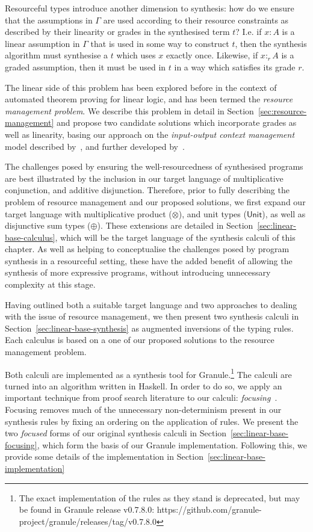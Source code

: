 Resourceful types introduce another dimension to synthesis: how do we ensure
that the assumptions in $\Gamma$ are used according to their resource
constraints as described by their linearity or grades in the synthesised term $t$? I.e. if $x : A$
is a linear assumption in $\Gamma$ that is used in some way to construct $t$,
then the synthesis algorithm must synthesise a $t$ which uses $x$ exactly once.
Likewise, if $x :_r A$ is a graded assumption, then it must be used in $t$ in a
way which satisfies its grade $r$.
 
The linear side of this problem has been explored before in the context of
automated theorem proving for linear logic, and has been termed the
\textit{resource management problem}. We describe this problem in detail in
Section~\ref{sec:resource-management} and propose two candidate solutions which
incorporate grades as well as linearity, basing our approach on the
\textit{input-output context management} model described
by~\citet{HODAS1994327}, and further developed by~\citet{CERVESATO2000133}. 

The challenges posed by ensuring the well-resourcedness of synthesised programs
are best illustrated by the inclusion in our target language of multiplicative
conjunction, and additive disjunction. Therefore, prior to fully describing the
problem of resource management and our proposed solutions, we first expand our
target language with multiplicative product ($\otimes$), and unit types
($\mathsf{Unit}$), as well as disjunctive sum types ($\oplus$). These extensions
are detailed in Section~\ref{sec:linear-base-calculus}, which will be the target
language of the synthesis calculi of this chapter. As well as helping to
conceptualise the challenges posed by program synthesis in a resourceful
setting, these have the added benefit of allowing the synthesis of more
expressive programs, without introducing unnecessary complexity at this stage.

Having outlined both a suitable target language and two approaches to dealing
with the issue of resource management, we then present two synthesis calculi in
Section~\ref{sec:linear-base-synthesis} as augmented inversions of the typing
rules. Each calculus is based on a one of our proposed solutions to the resource
management problem.  

Both calculi are implemented as a synthesis tool for
Granule.\footnote{The exact implementation of the rules as they stand is
deprecated, but may be found in Granule release v0.7.8.0:
https://github.com/granule-project/granule/releases/tag/v0.7.8.0} The calculi
are turned into an algorithm written in Haskell. In order to do so, we apply an
important technique from proof search literature to our calculi:
\emph{focusing}~\citep{focusing}. Focusing removes much of the unnecessary
non-determinism present in our synthesis rules by fixing an ordering on the
application of rules. We present the two \textit{focused} forms of our original
synthesis calculi in Section~\ref{sec:linear-base-focusing}, which form the
basis of our Granule implementation. Following this, we provide some details of
the implementation in Section~\ref{sec:linear-base-implementation}


